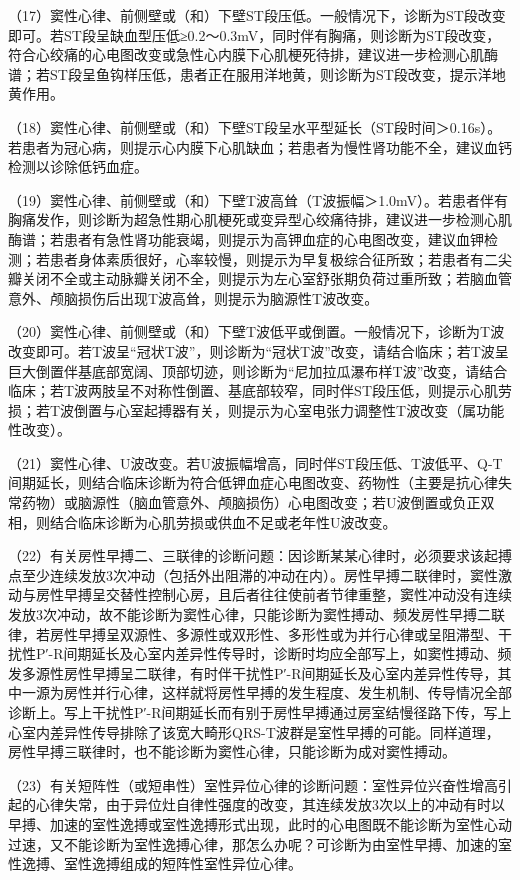 （17）窦性心律、前侧壁或（和）下壁ST段压低。一般情况下，诊断为ST段改变即可。若ST段呈缺血型压低≥0.2～0.3mV，同时伴有胸痛，则诊断为ST段改变，符合心绞痛的心电图改变或急性心内膜下心肌梗死待排，建议进一步检测心肌酶谱；若ST段呈鱼钩样压低，患者正在服用洋地黄，则诊断为ST段改变，提示洋地黄作用。

（18）窦性心律、前侧壁或（和）下壁ST段呈水平型延长（ST段时间＞0.16s）。若患者为冠心病，则提示心内膜下心肌缺血；若患者为慢性肾功能不全，建议血钙检测以诊除低钙血症。

（19）窦性心律、前侧壁或（和）下壁T波高耸（T波振幅＞1.0mV）。若患者伴有胸痛发作，则诊断为超急性期心肌梗死或变异型心绞痛待排，建议进一步检测心肌酶谱；若患者有急性肾功能衰竭，则提示为高钾血症的心电图改变，建议血钾检测；若患者身体素质很好，心率较慢，则提示为早复极综合征所致；若患者有二尖瓣关闭不全或主动脉瓣关闭不全，则提示为左心室舒张期负荷过重所致；若脑血管意外、颅脑损伤后出现T波高耸，则提示为脑源性T波改变。

（20）窦性心律、前侧壁或（和）下壁T波低平或倒置。一般情况下，诊断为T波改变即可。若T波呈“冠状T波”，则诊断为“冠状T波”改变，请结合临床；若T波呈巨大倒置伴基底部宽阔、顶部切迹，则诊断为“尼加拉瓜瀑布样T波”改变，请结合临床；若T波两肢呈不对称性倒置、基底部较窄，同时伴ST段压低，则提示心肌劳损；若T波倒置与心室起搏器有关，则提示为心室电张力调整性T波改变（属功能性改变）。

（21）窦性心律、U波改变。若U波振幅增高，同时伴ST段压低、T波低平、Q-T间期延长，则结合临床诊断为符合低钾血症心电图改变、药物性（主要是抗心律失常药物）或脑源性（脑血管意外、颅脑损伤）心电图改变；若U波倒置或负正双相，则结合临床诊断为心肌劳损或供血不足或老年性U波改变。

（22）有关房性早搏二、三联律的诊断问题：因诊断某某心律时，必须要求该起搏点至少连续发放3次冲动（包括外出阻滞的冲动在内）。房性早搏二联律时，窦性激动与房性早搏呈交替性控制心房，且后者往往使前者节律重整，窦性冲动没有连续发放3次冲动，故不能诊断为窦性心律，只能诊断为窦性搏动、频发房性早搏二联律，若房性早搏呈双源性、多源性或双形性、多形性或为并行心律或呈阻滞型、干扰性P′-R间期延长及心室内差异性传导时，诊断时均应全部写上，如窦性搏动、频发多源性房性早搏呈二联律，有时伴干扰性P′-R间期延长及心室内差异性传导，其中一源为房性并行心律，这样就将房性早搏的发生程度、发生机制、传导情况全部诊断上。写上干扰性P′-R间期延长而有别于房性早搏通过房室结慢径路下传，写上心室内差异性传导排除了该宽大畸形QRS-T波群是室性早搏的可能。同样道理，房性早搏三联律时，也不能诊断为窦性心律，只能诊断为成对窦性搏动。

（23）有关短阵性（或短串性）室性异位心律的诊断问题：室性异位兴奋性增高引起的心律失常，由于异位灶自律性强度的改变，其连续发放3次以上的冲动有时以早搏、加速的室性逸搏或室性逸搏形式出现，此时的心电图既不能诊断为室性心动过速，又不能诊断为室性逸搏心律，那怎么办呢？可诊断为由室性早搏、加速的室性逸搏、室性逸搏组成的短阵性室性异位心律。

